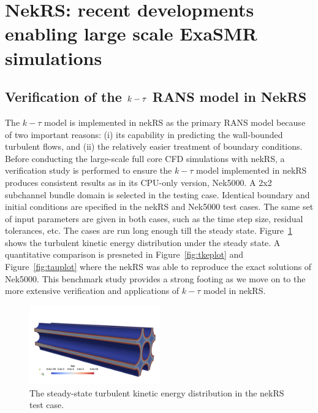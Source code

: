 \section{NekRS: recent developments enabling large scale ExaSMR simulations}
\label{sec:nekrs}


\subsection{Verification of the $\lowercase{k}-\tau$ RANS model in NekRS}
\label{sec:nrs1}
The $k-\tau$ model is implemented in nekRS as the primary RANS model because of two important reasons: (i) its capability in predicting the wall-bounded turbulent flows, and (ii) the relatively easier treatment of boundary conditions. Before conducting the large-scale full core CFD simulations with nekRS, a verification study is performed to ensure the $k-\tau$ model implemented in nekRS produces consistent results as in its CPU-only version, Nek5000. A 2x2 subchannel bundle domain is selected in the testing case. Identical boundary and initial conditions are specified in the nekRS and Nek5000 test cases. The same set of input parameters are given in both cases, such as the time step size, residual tolerances, etc. The cases are run long enough till the steady state. Figure~\ref{fig:tkeofbundle} shows the turbulent kinetic energy distribution under the steady state. A quantitative comparison is presneted in Figure~\ref{fig:tkeplot} and Figure~\ref{fig:tauplot} where the nekRS was able to reproduce the exact solutions of Nek5000. This benchmark study provides a strong footing as we move on to the more extensive  verification and applications of $k-\tau$ model in nekRS.


\begin{figure}[!ht]
\centering
\includegraphics[width=0.5\textwidth]{./figures/TKE_in_bundle.png}
\caption{The steady-state turbulent kinetic energy distribution in the nekRS test case. }
\label{fig:tkeofbundle}
\end{figure}

